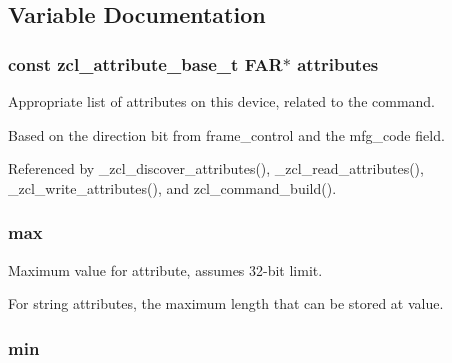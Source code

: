 \subsection{Variable Documentation}
\hypertarget{group__zcl_ga04c31df34f50e8dd1efaf1105631b2bc}{
\subsubsection[{attributes}]{\setlength{\rightskip}{0pt plus 5cm}const {\bf zcl\-\_\-attribute\-\_\-base\-\_\-t} {\bf F\-A\-R}$\ast$ attributes}}\label{group__zcl_ga04c31df34f50e8dd1efaf1105631b2bc}


Appropriate list of attributes on this device, related to the command. 

Based on the {\ttfamily direction} bit from {\ttfamily frame\-\_\-control} and the {\ttfamily mfg\-\_\-code} field. 

Referenced by \-\_\-zcl\-\_\-discover\-\_\-attributes(), \-\_\-zcl\-\_\-read\-\_\-attributes(), \-\_\-zcl\-\_\-write\-\_\-attributes(), and zcl\-\_\-command\-\_\-build().

\hypertarget{group__zcl_gae2490849003f8344782c06334b1e6b17}{
\subsubsection[{max}]{ max}}\label{group__zcl_gae2490849003f8344782c06334b1e6b17}


Maximum value for attribute, assumes 32-\/bit limit. 

For string attributes, the maximum length that can be stored at {\ttfamily value}. \hypertarget{group__zcl_gaad888af9d07cd3b611c75f15f8c90dfe}{
\subsubsection[{min}]{ min}}\label{group__zcl_gaad888af9d07cd3b611c75f15f8c90dfe}


